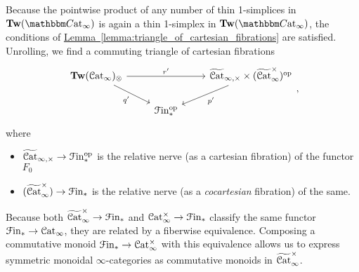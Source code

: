 \documentclass[main.tex]{subfiles}
\begin{document}
Because the pointwise product of any number of thin 1-simplices in $\Tw(\ICCat)$ is again a thin 1-simplex in $\Tw(\ICCat)$, the conditions of \hyperref[lemma:triangle_of_cartesian_fibrations]{Lemma~\ref*{lemma:triangle_of_cartesian_fibrations}} are satisfied. Unrolling, we find a commuting triangle of cartesian fibrations
\begin{equation}
  \label{eq:base_triangle}
  \begin{tikzcd}
    \Tw(\ICat)_{\otimes}
    \arrow[rr, "r'"]
    \arrow[dr, swap, "q'"]
    && \TICatCart \times (\TICatCocart)\op
    \arrow[dl, "p'"]
    \\
    & \Finp\op
  \end{tikzcd},
\end{equation}
where
\begin{itemize}
  \item $\widetilde{\mathcal{C}\mathrm{at}}_{\infty,\times} \to \mathcal{F}\mathrm{in}_{*}^{\mathrm{op}}$ is the relative nerve (as a cartesian fibration) of the functor $F_{0}$

  \item $(\widetilde{\mathcal{C}\mathrm{at}}_{\infty}^{\times}) \to \mathcal{F}\mathrm{in}_{*}$ is the relative nerve (as a \emph{cocartesian} fibration) of the same.
\end{itemize}

Because both $\widetilde{\mathcal{C}\mathrm{at}}_{\infty}^{\times} \to \mathcal{F}\mathrm{in}_{*}$ and $\mathcal{C}\mathrm{at}_{\infty}^{\times} \to \mathcal{F}\mathrm{in}_{*}$ classify the same functor $\mathcal{F}\mathrm{in}_{*} \to \mathcal{C}\mathrm{at}_{\infty}$, they are related by a fiberwise equivalence. Composing a commutative monoid $\mathcal{F}\mathrm{in}_{*} \to \mathcal{C}\mathrm{at}_{\infty}^{\times}$ with this equivalence allows us to express symmetric monoidal $\infty$-categories as commutative monoids in $\widetilde{\mathcal{C}\mathrm{at}}_{\infty}^{\times}$.
\end{document}
